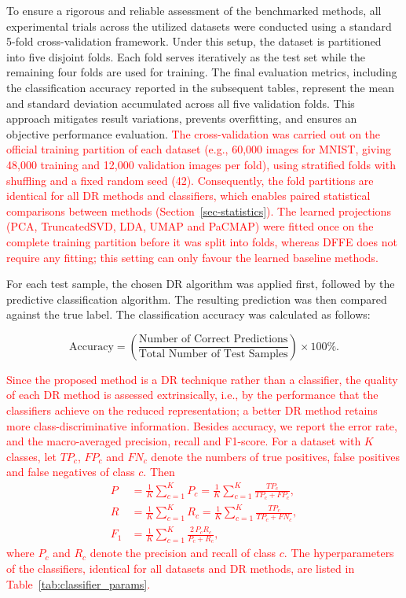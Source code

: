 \documentclass[a4paper,fleqn]{cas-dc}
\begin{document}
To ensure a rigorous and reliable assessment of the benchmarked methods, all experimental trials across the utilized datasets were conducted using a standard 5-fold cross-validation framework. Under this setup, the dataset is partitioned into five disjoint folds. Each fold serves iteratively as the test set while the remaining four folds are used for training. The final evaluation metrics, including the classification accuracy reported in the subsequent tables, represent the mean and standard deviation accumulated across all five validation folds. This approach mitigates result variations, prevents overfitting, and ensures an objective performance evaluation. \textcolor{red}{The cross-validation was carried out on the official training partition of each dataset (e.g., 60{,}000 images for MNIST, giving 48{,}000 training and 12{,}000 validation images per fold), using stratified folds with shuffling and a fixed random seed (42). Consequently, the fold partitions are identical for all DR methods and classifiers, which enables paired statistical comparisons between methods (Section~\ref{sec-statistics}). The learned projections (PCA, TruncatedSVD, LDA, UMAP and PaCMAP) were fitted once on the complete training partition before it was split into folds, whereas DFFE does not require any fitting; this setting can only favour the learned baseline methods.}

For each test sample, the chosen DR algorithm was applied first, followed by the predictive classification algorithm. The resulting prediction was then compared against the true label. The classification accuracy was calculated as follows:

\begin{equation}
    \label{eq:accuracy}
    \text{Accuracy} = \left( \frac{\text{Number of Correct Predictions}}{\text{Total Number of Test Samples}} \right) \times 100\%.
\end{equation}

\textcolor{red}{Since the proposed method is a DR technique rather than a classifier, the quality of each DR method is assessed extrinsically, i.e., by the performance that the classifiers achieve on the reduced representation; a better DR method retains more class-discriminative information. Besides accuracy, we report the error rate, and the macro-averaged precision, recall and F1-score. For a dataset with $K$ classes, let $TP_c$, $FP_c$ and $FN_c$ denote the numbers of true positives, false positives and false negatives of class $c$. Then
\begin{equation}
\begin{aligned}
    P &= \frac{1}{K}\sum_{c=1}^{K} P_c = \frac{1}{K}\sum_{c=1}^{K} \frac{TP_c}{TP_c + FP_c}, \\
    R &= \frac{1}{K}\sum_{c=1}^{K} R_c = \frac{1}{K}\sum_{c=1}^{K} \frac{TP_c}{TP_c + FN_c}, \\
    F_1 &= \frac{1}{K}\sum_{c=1}^{K} \frac{2\,P_c R_c}{P_c + R_c},
\end{aligned}
\end{equation}
where $P_c$ and $R_c$ denote the precision and recall of class $c$. The hyperparameters of the classifiers, identical for all datasets and DR methods, are listed in Table~\ref{tab:classifier_params}.}
\end{document}
